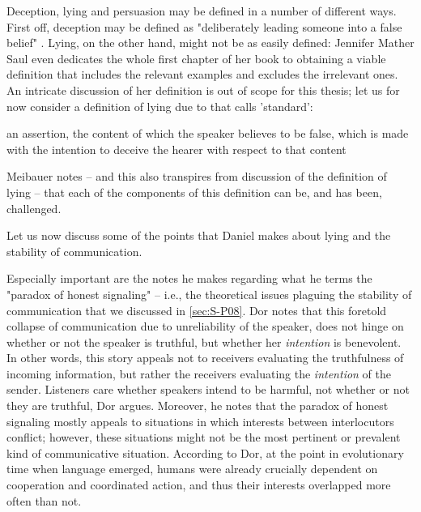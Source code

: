 Deception, lying and persuasion may be defined in a number of different ways.
First off, deception may be defined as "deliberately leading someone into a false belief" \citep[p.~358]{Meibauer18}.
Lying, on the other hand, might not be as easily defined: Jennifer Mather Saul even dedicates the whole first chapter of her \citeyear{Saul12} book to obtaining a viable definition that includes the relevant examples and excludes the irrelevant ones. An intricate discussion of her definition is out of scope for this thesis; let us for now consider a definition of lying due to \citet{Williams02} that \citet{Meibauer18} calls 'standard':
\begin{quoting}
    an assertion, the content of which the speaker believes to be false, which is made with the intention to deceive the hearer with respect to that content
    \hfill \citep[p.~96]{Williams02}
\end{quoting}
Meibauer notes -- and this also transpires from  discussion of the definition of lying -- that each of the components of this definition can be, and has been, challenged.

Let us now discuss some of the points that Daniel \citet{Dor17} makes about lying and the stability of communication.

Especially important are the notes he makes regarding what he terms the "paradox of honest signaling" \citep[p.~46]{Dor17} -- i.e., the theoretical issues plaguing the stability of communication that we discussed in \cref{sec:S-P08}. 
Dor notes that this foretold collapse of communication due to unreliability of the speaker, does not hinge on whether or not the speaker is truthful, but whether her \emph{intention} is benevolent.
In other words, this story appeals not to receivers evaluating the truthfulness of incoming information, but rather the receivers evaluating the \emph{intention} of the sender. Listeners care whether speakers intend to be harmful, not whether or not they are truthful, Dor argues.
Moreover, he notes that the paradox of honest signaling mostly appeals to situations in which interests between interlocutors conflict; however, these situations might not be the most pertinent or prevalent kind of communicative situation.
According to Dor, at the point in evolutionary time when language emerged, humans were already crucially dependent on cooperation and coordinated action, and thus their interests overlapped more often than not.

